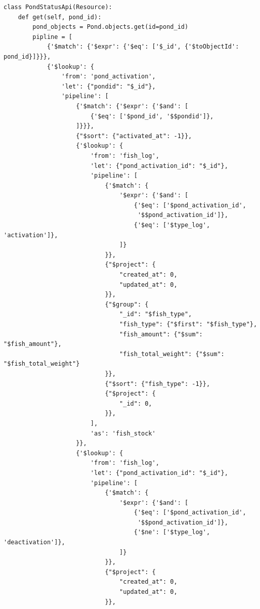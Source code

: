\begin{enumerate}[1.]
\begin{lstlisting}
class PondStatusApi(Resource):
    def get(self, pond_id):
        pond_objects = Pond.objects.get(id=pond_id)
        pipline = [
            {'$match': {'$expr': {'$eq': ['$_id', {'$toObjectId': pond_id}]}}},
            {'$lookup': {
                'from': 'pond_activation',
                'let': {"pondid": "$_id"},
                'pipeline': [
                    {'$match': {'$expr': {'$and': [
                        {'$eq': ['$pond_id', '$$pondid']},
                    ]}}},
                    {"$sort": {"activated_at": -1}},
                    {'$lookup': {
                        'from': 'fish_log',
                        'let': {"pond_activation_id": "$_id"},
                        'pipeline': [
                            {'$match': {
                                '$expr': {'$and': [
                                    {'$eq': ['$pond_activation_id',
                                     '$$pond_activation_id']},
                                    {'$eq': ['$type_log', 'activation']},
                                ]}
                            }},
                            {"$project": {
                                "created_at": 0,
                                "updated_at": 0,
                            }},
                            {"$group": {
                                "_id": "$fish_type",
                                "fish_type": {"$first": "$fish_type"},
                                "fish_amount": {"$sum": "$fish_amount"},
                                "fish_total_weight": {"$sum": "$fish_total_weight"}
                            }},
                            {"$sort": {"fish_type": -1}},
                            {"$project": {
                                "_id": 0,
                            }},
                        ],
                        'as': 'fish_stock'
                    }},
                    {'$lookup': {
                        'from': 'fish_log',
                        'let': {"pond_activation_id": "$_id"},
                        'pipeline': [
                            {'$match': {
                                '$expr': {'$and': [
                                    {'$eq': ['$pond_activation_id',
                                     '$$pond_activation_id']},
                                    {'$ne': ['$type_log', 'deactivation']},
                                ]}
                            }},
                            {"$project": {
                                "created_at": 0,
                                "updated_at": 0,
                            }},

\end{lstlisting}
\end{enumerate}
